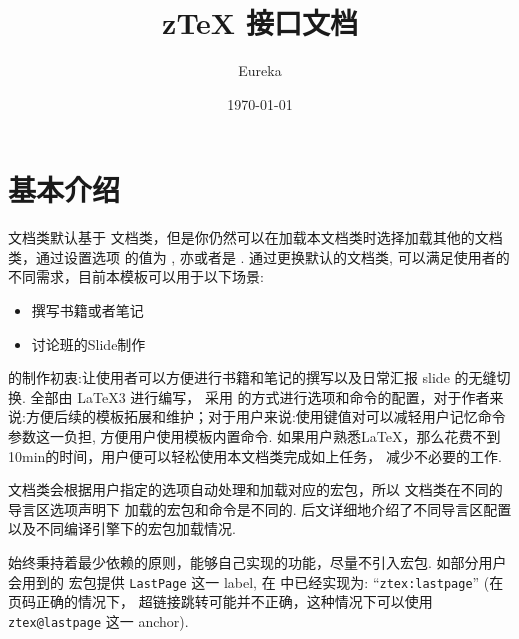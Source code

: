 \documentclass[
  lang=cn, 
  hyper=true,
  class=l3dox, 
]{../code/ztex}
\title{\texorpdfstring{\vspace{-4pt}z\TeX{} 接口文档}{zTeX 接口文档}}
\author{Eureka}
\date{\today}
\begin{document}
\thmCommandRestore
\ExplSyntaxOn
{}
\ExplSyntaxOff
{}
  \maketitle
\restoregeometry

  \ztexslideTF{
    \thispagestyle{empty}
    \tableofcontents
  }{
    \thispagestyle{empty}
    \vspace*{-3em}
    \tableofcontents
    \clearpage
  }
\restoregeometry

\fancyheadoffset{0pt}


\section{基本介绍}
\ztex{} 文档类默认基于  文档类，但是你仍然可以在加载本文档类时选择加载其他的文档类，通过设置选项  的值为 
,  亦或者是 . 通过更换默认的文档类, \zTeX{} 可以满足使用者的不同需求，目前本模板可以用于以下场景:
\begin{itemize}
  \item 撰写书籍或者笔记
  \item 讨论班的Slide制作%
\end{itemize}

\ztex{} 的制作初衷:让使用者可以方便进行书籍和笔记的撰写以及日常汇报 slide 的无缝切换. \ztex{} 全部由 \LaTeX3 进行编写，
采用  的方式进行选项和命令的配置，对于作者来说:方便后续的模板拓展和维护；对于用户来说:使用键值对可以减轻用户记忆命令
参数这一负担, 方便用户使用模板内置命令. 如果用户熟悉\LaTeX{}，那么花费不到10min的时间，用户便可以轻松使用本文档类完成如上任务，
减少不必要的工作.

\ztex{} 文档类会根据用户指定的选项自动处理和加载对应的宏包，所以 \ztex{} 文档类在不同的导言区选项声明下
加载的宏包和命令是不同的. 后文详细地介绍了不同导言区配置以及不同编译引擎下的宏包加载情况. 

\ztex{} 始终秉持着最少依赖的原则，能够自己实现的功能，尽量不引入宏包. 如部分用户会用到的  宏包提供
\texttt{LastPage} 这一 label, 在 \zTeX{} 中已经实现为: ``\texttt{ztex:lastpage}'' (在页码正确的情况下，
超链接跳转可能并不正确，这种情况下可以使用 \texttt{ztex@lastpage} 这一 anchor).
\end{document}
